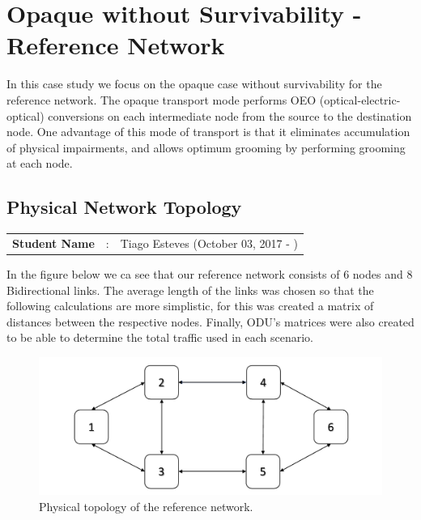 \clearpage

\section{Opaque without Survivability - Reference Network} \label{Reference_Network}

In this case study we focus on the opaque case without survivability for the reference network.
The opaque transport mode performs OEO (optical-electric-optical) conversions on each intermediate node from the source to the destination node.
One advantage of this mode of transport is that it eliminates accumulation of physical impairments, and allows optimum grooming by performing grooming at each node.

\subsection{Physical Network Topology}\label{Reference_Network_Topology}
\begin{tcolorbox}	
\begin{tabular}{p{2.75cm} p{0.2cm} p{10.5cm}} 	
\textbf{Student Name}  &:& Tiago Esteves    (October 03, 2017 - )\\
\end{tabular}
\end{tcolorbox}


In the figure below we ca see that our reference network consists of 6 nodes and 8 Bidirectional links.
The average length of the links was chosen so that the following calculations are more simplistic, for this was created a matrix of distances between the respective nodes.
Finally, ODU's matrices were also created to be able to determine the total traffic used in each scenario.\\

\begin{figure}[h!]
\centering
\includegraphics[width=\textwidth]{sdf/opaque/figures/RedeTeste}
\caption{Physical topology of the reference network.}
\end{figure}

